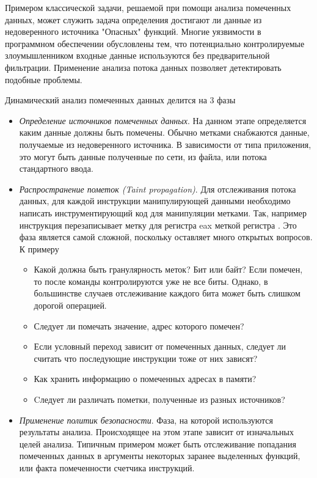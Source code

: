 Примером классической задачи, решаемой при помощи анализа помеченных данных, может служить задача определения достигают ли данные из недоверенного источника "Опасных" функций. Многие уязвимости в программном обеспечении обусловлены тем, что потенциально контролируемые злоумышленником входные данные используются без предварительной фильтрации. Применение анализа потока данных позволяет детектировать подобные проблемы.

Динамический анализ помеченных данных делится на 3 фазы

    \begin{itemize}
        \item {\em Определение источников помеченных данных}. На данном этапе определяется каким данные должны быть помечены. Обычно метками снабжаются данные, получаемые из недоверенного
        источника. В зависимости от типа приложения, это могут быть данные полученные по сети, из файла, или потока стандартного ввода.
        \item {\em Распространение пометок (Taint propagation)}. Для отслеживания потока данных, 
        для каждой инструкции манипулирующей данными необходимо написать инструментирующий код для манипуляции метками. Так, например инструкция  перезаписывает метку для регистра eax меткой регистра . Это фаза является самой сложной, поскольку оставляет много открытых вопросов. К примеру
        \begin{itemize}
            \item Какой должна быть гранулярность меток? Бит или байт? Если  помечен, то после команды  контролируются уже не все биты. Однако, в большинстве случаев отслеживание каждого бита может быть слишком дорогой операцией.
            \item Следует ли помечать значение, адрес которого помечен?
            \item Если условный переход зависит от помеченных данных, следует ли считать что последующие инструкции тоже от них зависят?
            \item Как хранить информацию о помеченных адресах в памяти?
            \item Cледует ли различать пометки, полученные из разных источников?
        \end{itemize}
        \item {\em Применение политик безопасности}. Фаза, на которой используются результаты анализа. Происходящее на этом этапе зависит от изначальных целей анализа. Типичным примером может быть отслеживание попадания помеченных данных в аргументы некоторых заранее выделенных функций, или факта помеченности счетчика инструкций.
    \end{itemize}

